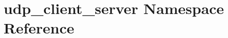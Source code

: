 \hypertarget{namespaceudp__client__server}{}\section{udp\+\_\+client\+\_\+server Namespace Reference}
\label{namespaceudp__client__server}
